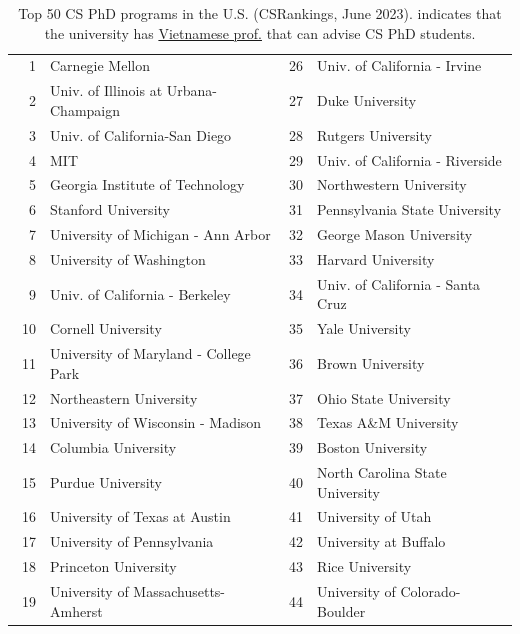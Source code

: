 \documentclass[11pt]{article}
\newcommand{\red}[1]{{\color{red}{#1}}}
\begin{document}
  \begin{table}[h!]
    \centering
    \small
    \caption{Top 50 CS PhD programs in the U.S. (CSRankings, June 2023). \red{$^*$} indicates that the university has \href{https://github.com/dynaroars/dynaroars.github.io/wiki/Viet-CS-Profs-US}{Vietnamese prof.} that can advise CS PhD students.}\label{tab:ranking}
  \begin{tabular}{rl|rl}
    \toprule
    1 & Carnegie Mellon & 26 & Univ. of California - Irvine \\
    2 & Univ. of Illinois at Urbana-Champaign\red{$^*$}  & 27 &  Duke University \\
    3 & Univ. of California-San Diego & 28 & Rutgers University\red{$^*$} \\
    4 & MIT & 29 & Univ. of California - Riverside\\
    5 & Georgia Institute of Technology         & 30 & Northwestern University\\
    6 & Stanford University& 31 & Pennsylvania State University  \\
    7 & University of Michigan - Ann Arbor\red{$^*$}   & 32& George Mason University\red{$^*$}\\  
    8 & University of Washington      &33 &  Harvard University \\
    9 &  Univ. of California - Berkeley  &34&  Univ. of California - Santa Cruz \\
    10 & Cornell University  & 35 &  Yale University \\
    11 & University of Maryland - College Park &  36& Brown University \\ 
    12 & Northeastern University\red{$^*$} &37&  Ohio State University\\
    13 & University of Wisconsin - Madison\red{$^*$}  &38& Texas A\&M University\red{$^*$} \\
    14 & Columbia University   &39 & Boston University  \\
    15 &   Purdue University  &40& North Carolina State University\\\  
    16 & University of Texas at Austin   &41 & University of Utah \\
    17 & University of Pennsylvania\red{$^*$} &42 & University at Buffalo\red{$^*$}\\
    18 & Princeton University  & 43& Rice University\\
    19 & University of Massachusetts-Amherst\red{$^*$} & 44&  University of Colorado-Boulder \\

\end{tabular}
\end{table}
\end{document}
